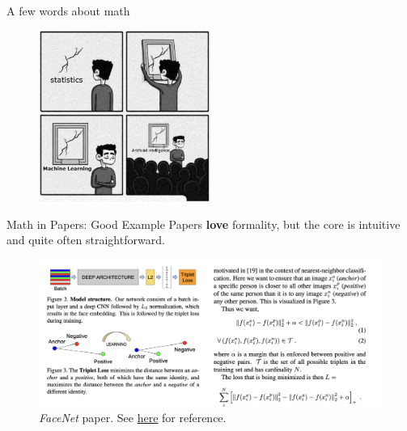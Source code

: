 \documentclass{beamer}
\begin{document}
    \begin{frame}{A few words about math}



        \begin{figure}
        \centering
            \includegraphics[width=0.5\textwidth]{images/presentation/meme.jpg}
        \end{figure}
    \end{frame}
    \begin{frame}{Math in Papers: Good Example}
        Papers \textbf{love} formality, but the core is intuitive and quite often straightforward.

        \begin{figure}
        \centering
            \includegraphics[width=\textwidth]{images/presentation/facenet.png}
            \caption{\textit{FaceNet} paper. See \href{https://arxiv.org/pdf/1503.03832.pdf}{here} for reference.}
        \end{figure}
    \end{frame}
    
\end{document}
